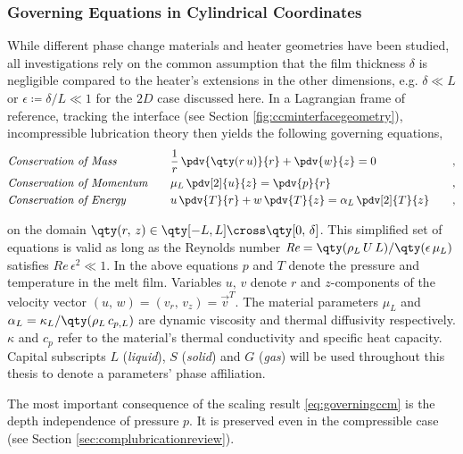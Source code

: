 \subsubsection{Governing Equations in Cylindrical Coordinates}

While different phase change materials and heater geometries have been studied, all investigations rely on the common assumption that the film thickness $\delta$ is negligible compared to the heater's extensions in the other dimensions, e.g. $\delta \ll L$ or $\epsilon \coloneqq \delta / L\ll 1$ for the $2D$ case discussed here. In a Lagrangian frame of reference, tracking the interface (see Section \ref{fig:ccminterfacegeometry}), incompressible lubrication theory  \cite{hamrock2004fundamentalslubrication} then yields the following governing equations,
\begin{subequations}\label{eq:governingccm}
\begin{flalign}
    &\textit{Conservation of Mass}\quad && \frac{1}{r}\,\pdv{\qty(r\,u)}{r} + \pdv{w}{z}  = 0 & \quad , \label{eq:massccm}\\
    &\textit{Conservation of Momentum}\quad && \mu_L\,\pdv[2]{u}{z} = \pdv{p}{r} &   \quad ,\label{eq:momccm}\\
    &\textit{Conservation of Energy}\quad && u\,\pdv{T}{r} + w\,\pdv{T}{z}  = \alpha_L\,\pdv[2]{T}{z} & \quad , \label{eq:energyccm}
\end{flalign}
\end{subequations}

on the domain $\qty(r,\,z)\in\qty[-L,L]\cross\qty[0,\,\delta]$. This simplified set of equations is valid as long as the Reynolds number $\textit{Re}=\qty(\rho_L\,U\,L)/\qty(\epsilon\,\mu_L)$ satisfies $\textit{Re}\,\epsilon^2\ll1$. In the above equations $p$ and $T$ denote the pressure and temperature in the melt film. Variables $u,\,v$ denote $r$ and $z$-components of the velocity vector $(u,\,w)=(v_r,\,v_z) = \Vec{v}^T$. The material parameters $\mu_L$ and $\alpha_L=\kappa_L / \qty(\rho_L\,c_{p,L})$ are dynamic viscosity and thermal diffusivity respectively. $\kappa$ and $c_p$ refer to the material's thermal conductivity and specific heat capacity. Capital subscripts $L$ (\textit{liquid}), $S$ (\textit{solid}) and $G$ (\textit{gas}) will be used throughout this thesis to denote a parameters' phase affiliation.

The most important consequence of the scaling result \ref{eq:governingccm} is the depth independence of pressure $p$. It is preserved even in the compressible case (see Section \ref{sec:complubricationreview}).

